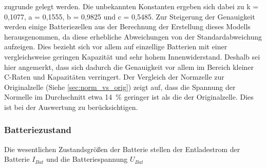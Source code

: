 zugrunde gelegt werden. 
Die unbekannten Konstanten ergeben sich dabei zu k = 0,1077, a = 0,1555, b = 0,9825 und c = 0,5485. Zur Steigerung der Genauigkeit werden einige Batteriezellen aus der Berechnung der Erstellung dieses Modells herausgenommen, da diese erhebliche Abweichungen von der Standardabweichung aufzeigen. Dies bezieht sich vor allem auf einzellige Batterien mit einer vergleichsweise geringen Kapazität und sehr hohem Innenwiderstand. Deshalb sei hier angemerkt, dass sich dadurch die Genauigkeit vor allem im Bereich kleiner C-Raten und Kapazitäten verringert.
Der Vergleich der Normzelle zur Originalzelle (Siehe \ref{sec:norm_vs_orig}) zeigt auf, dass die Spannung der Normelle im Durchschnitt etwa \SI{14}{\%} geringer ist als die der Originalzelle. Dies ist bei der Auswertung zu berücksichtigen.


\subsubsection{Batteriezustand}
Die wesentlichen Zustandsgrößen der Batterie stellen der Entladestrom der Batterie \ensuremath{I_{Bat}} und die Batteriespannung \ensuremath{U_{Bat}}


